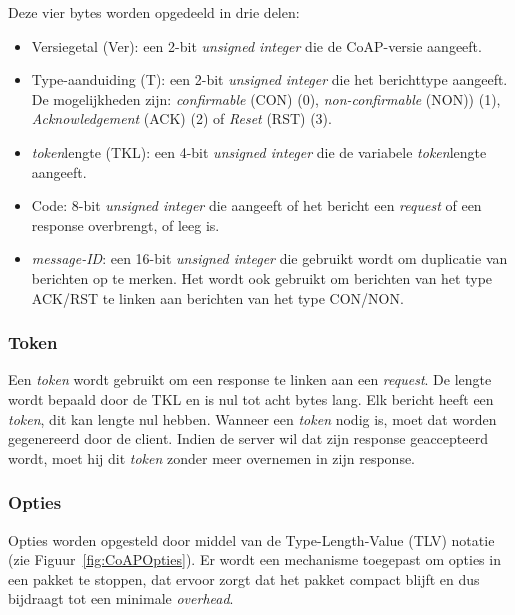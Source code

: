 Deze vier bytes worden opgedeeld in drie delen:
\begin{itemize}
\item Versiegetal (Ver): een 2-bit \textit{unsigned integer} die de CoAP-versie aangeeft. 
\item Type-aanduiding (T): een 2-bit \textit{unsigned integer} die het berichttype aangeeft. De mogelijkheden zijn: \textit{confirmable} (CON)  (0), \textit{non-confirmable} (NON))  (1), \textit{Acknowledgement} (ACK)  (2) of \textit{Reset} (RST)  (3).
\item \textit{token}lengte (TKL): een 4-bit \textit{unsigned integer} die de variabele \textit{token}lengte aangeeft.
\item Code: 8-bit \textit{unsigned integer} die aangeeft of het bericht een \textit{request} of een response overbrengt, of leeg is.
\item \textit{message-ID}: een 16-bit \textit{unsigned integer} die gebruikt wordt om duplicatie van berichten op te merken. Het wordt ook gebruikt om berichten van het type ACK/RST te linken aan berichten van het type CON/NON.
\end{itemize}

\subsubsection{Token}

Een \textit{token} wordt gebruikt om een response te linken aan een \textit{request}. De lengte wordt bepaald door de TKL en is nul tot acht bytes lang. Elk bericht heeft een \textit{token}, dit kan lengte nul hebben. Wanneer een \textit{token} nodig is, moet dat worden gegenereerd door de client. Indien de server wil dat zijn response geaccepteerd wordt, moet hij dit \textit{token} zonder meer overnemen in zijn response.

\subsubsection{Opties}

Opties worden opgesteld door middel van de Type-Length-Value (TLV) notatie (zie Figuur~\ref{fig:CoAPOpties}). Er wordt een mechanisme toegepast om opties in een pakket te stoppen, dat ervoor zorgt dat het pakket compact blijft en dus bijdraagt tot een minimale \textit{overhead}.\\

